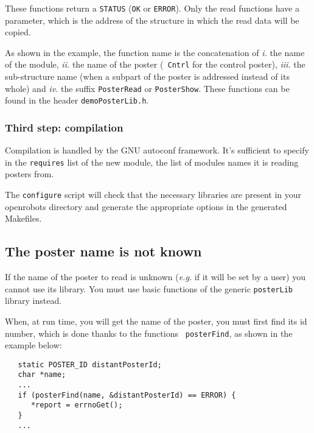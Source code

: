 These functions return a {\tt STATUS} ({\tt OK} or {\tt ERROR}). Only the
read functions have a parameter, which is the address of the structure in
which the read data will be copied.

As shown in the example, the  function name is  the concatenation of {\em
i.} the name  of  the module, {\em ii.}   the  name of the  poster  ({\tt
Cntrl} for the control poster), {\em  iii.}  the sub-structure name (when
a subpart of the poster is addressed instead of  its whole) and {\em iv.}
the suffix {\tt PosterRead} or {\tt PosterShow}.   These functions can be
found in the header {\tt demoPosterLib.h}.


\subsubsection{Third step: compilation}

Compilation is handled by the GNU autoconf framework. 
It's sufficient to specify in the \texttt{requires} list of the new
module, the list of modules names it is reading posters from.  

The \texttt{configure} script will check that the necessary libraries
are present in your openrobots directory and generate the appropriate
options in the generated Makefiles.
  


\subsection{The poster name is not known}

If the name of the  poster to read is unknown  ({\em e.g.} if it will  be
set by a user) you  cannot use its  library. You must use basic functions
of the generic {\tt posterLib} library instead.

When, at run time,  you will get the  name of the  poster, you must first
find  its id  number,  which   is done  thanks   to the   functions  {\tt
posterFind}, as shown in the example below:

\begin{center}\begin{cartouche}\small\begin{verbatim}
   static POSTER_ID distantPosterId;
   char *name;
   ...
   if (posterFind(name, &distantPosterId) == ERROR) {
      *report = errnoGet();
   }
   ...
\end{verbatim}\end{cartouche}\end{center}

